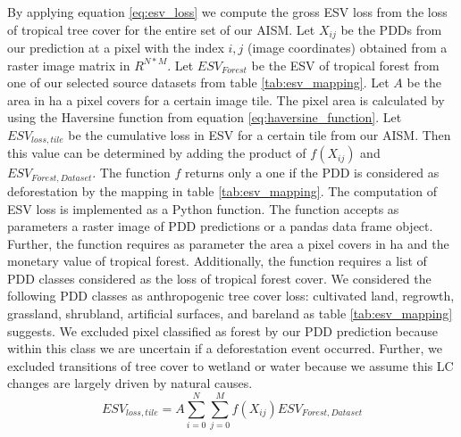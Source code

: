 		By applying equation \ref{eq:esv_loss} we compute the gross \ac{ESV} loss from the loss of tropical tree cover for the entire set of our \ac{AISM}. Let $X_{ij}$ be the \acp{PDD} from our prediction at a pixel with the index $i,j$ (image coordinates) obtained from a raster image matrix in $R^{N*M}$. Let $ESV_{Forest}$ be the \ac{ESV} of tropical forest from one of our selected source datasets from table \ref{tab:esv_mapping}. Let $A$ be the area in ha a pixel covers for a certain image tile. The pixel area is calculated by using the Haversine function from equation \ref{eq:haversine_function}. Let $ESV_{loss,tile}$ be the cumulative loss in \ac{ESV} for a certain tile from our \ac{AISM}. Then this value can be determined by adding the product of $f(X_{ij})$ and $ESV_{Forest,Dataset}$. The function $f$ returns only a one if the \ac{PDD} is considered as deforestation by the mapping in table \ref{tab:esv_mapping}. The computation of \ac{ESV} loss is implemented as a Python function. The function accepts as parameters a raster image of \ac{PDD} predictions or a pandas data frame object. Further, the function requires as parameter the area a pixel covers in ha and the monetary value of tropical forest. Additionally, the function requires a list of \ac{PDD} classes considered as the loss of tropical forest cover. We considered the following \ac{PDD} classes as anthropogenic tree cover loss: cultivated land, regrowth, grassland, shrubland, artificial surfaces, and bareland as table \ref{tab:esv_mapping} suggests. We excluded pixel classified as forest by our \ac{PDD} prediction because within this class we are uncertain if a deforestation event occurred. Further, we excluded transitions of tree cover to wetland or water because we assume this \ac{LC} changes are largely driven by natural causes.
		\begin{equation}
		\label{eq:esv_loss}
			ESV_{loss,tile} = A\displaystyle\sum_{i=0}^{N}\displaystyle\sum_{j=0}^{M} f(X_{ij})ESV_{Forest,Dataset}
		\end{equation}
